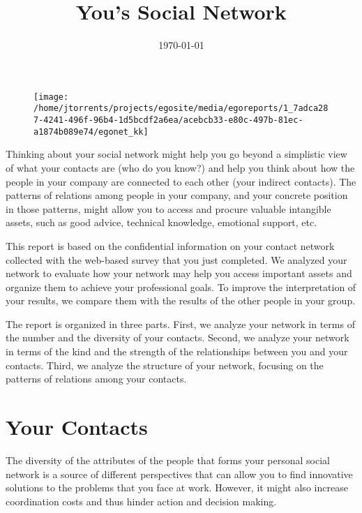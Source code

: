 \documentclass[a4paper,12pt]{article}
\title{You's Social Network}
\date{\today}
\begin{document}
\maketitle


\begin{figure}[H]
\centering
\texttt{[image: /home/jtorrents/projects/egosite/media/egoreports/1\_7adca287-4241-496f-96b4-1d5bcdf2a6ea/acebcb33-e80c-497b-81ec-a1874b089e74/egonet\_kk]}
\end{figure}


\tableofcontents
\newpage


Thinking about your social network might help you go beyond a simplistic view of what your contacts are (who do you know?) and help you think about how the people in your company are connected to each other (your indirect contacts). The patterns of relations among people in your company, and your concrete position in those patterns, might allow you to access and procure valuable intangible assets, such as good advice, technical knowledge, emotional support, etc.

This report is based on the confidential information on your contact network collected with the web-based survey that you just completed. We analyzed your network to evaluate how your network may help you access important assets and organize them to achieve your professional goals. To improve the interpretation of your results, we compare them with the results of the other people in your group.

The report is organized in three parts. First, we analyze your network in terms of the number and the diversity of your contacts. Second, we analyze your network in terms of the kind and the strength of the relationships between you and your contacts. Third, we analyze the structure of your network, focusing on the patterns of relations among your contacts.


\section{Your Contacts}


The diversity of the attributes of the people that forms your personal social network is a source of different perspectives that can allow you to find innovative solutions to the problems that you face at work. However, it might also increase coordination costs and thus hinder action and decision making.
\end{document}
